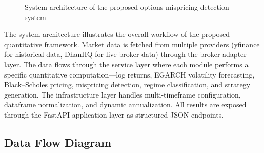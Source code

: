\documentclass[12pt,a4paper]{article}
\begin{document}
\begin{figure}[H]
\caption{System architecture of the proposed options mispricing detection system}
\label{fig:architecture}
\end{figure}

The system architecture illustrates the overall workflow of the proposed quantitative framework. Market data is fetched from multiple providers (yfinance for historical data, DhanHQ for live broker data) through the broker adapter layer. The data flows through the service layer where each module performs a specific quantitative computation---log returns, EGARCH volatility forecasting, Black--Scholes pricing, mispricing detection, regime classification, and strategy generation. The infrastructure layer handles multi-timeframe configuration, dataframe normalization, and dynamic annualization. All results are exposed through the FastAPI application layer as structured JSON endpoints.

\subsection{Data Flow Diagram}
\end{document}
